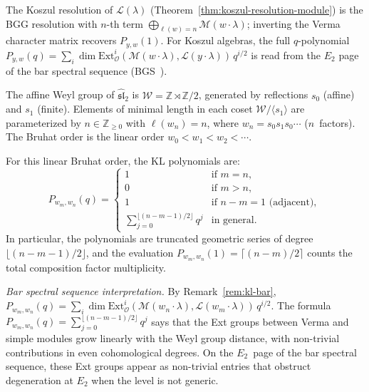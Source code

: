 \begin{remark}
\label{rem:kl-bar}
The Koszul resolution of $\mathcal{L}(\lambda)$ (Theorem~\ref{thm:koszul-resolution-module}) is the BGG resolution with $n$-th term $\bigoplus_{\ell(w) = n} \mathcal{M}(w \cdot \lambda)$; inverting the Verma character matrix recovers $P_{y,w}(1)$. For Koszul algebras, the full $q$-polynomial $P_{y,w}(q) = \sum_i \dim \mathrm{Ext}^i_{\mathcal{O}}(\mathcal{M}(w \cdot \lambda), \mathcal{L}(y \cdot \lambda))\, q^{i/2}$ is read from the $E_2$ page of the bar spectral sequence (BGS~\cite{BGS96}).
\end{remark}

\begin{example}
\label{ex:kl-sl2}
The affine Weyl group of $\widehat{\mathfrak{sl}}_2$ is
$\mathcal{W} = \mathbb{Z} \rtimes \mathbb{Z}/2$, generated by
reflections $s_0$ (affine) and $s_1$ (finite). Elements of minimal
length in each coset $\mathcal{W}/\langle s_1 \rangle$ are
parameterized by $n \in \mathbb{Z}_{\geq 0}$ with $\ell(w_n) = n$,
where $w_n = s_0 s_1 s_0 \cdots$ ($n$~factors). The Bruhat order is
the linear order $w_0 < w_1 < w_2 < \cdots$.

For this linear Bruhat order, the KL polynomials are:
\[
P_{w_m, w_n}(q) = \begin{cases}
1 & \text{if } m = n, \\
0 & \text{if } m > n, \\
1 & \text{if } n - m = 1 \text{ (adjacent)}, \\
\displaystyle\sum_{j=0}^{\lfloor(n-m-1)/2\rfloor} q^j
& \text{in general.}
\end{cases}
\]
In particular, the polynomials are truncated geometric series of
degree $\lfloor(n-m-1)/2\rfloor$, and the evaluation
$P_{w_m, w_n}(1) = \lceil(n-m)/2\rceil$ counts the total
composition factor multiplicity.

\emph{Bar spectral sequence interpretation.}
By Remark~\ref{rem:kl-bar}, $P_{w_m, w_n}(q) = \sum_i \dim
\mathrm{Ext}^i_{\mathcal{O}}(\mathcal{M}(w_n \cdot \lambda),
\mathcal{L}(w_m \cdot \lambda))\, q^{i/2}$. The formula
$P_{w_m, w_n}(q) = \sum_{j=0}^{\lfloor(n-m-1)/2\rfloor} q^j$ says
that the Ext groups between Verma and simple modules grow linearly
with the Weyl group distance, with non-trivial contributions in even
cohomological degrees. On the $E_2$~page of the bar spectral
sequence, these Ext groups appear as non-trivial entries that
obstruct degeneration at $E_2$ when the level is not generic.
\end{example}

